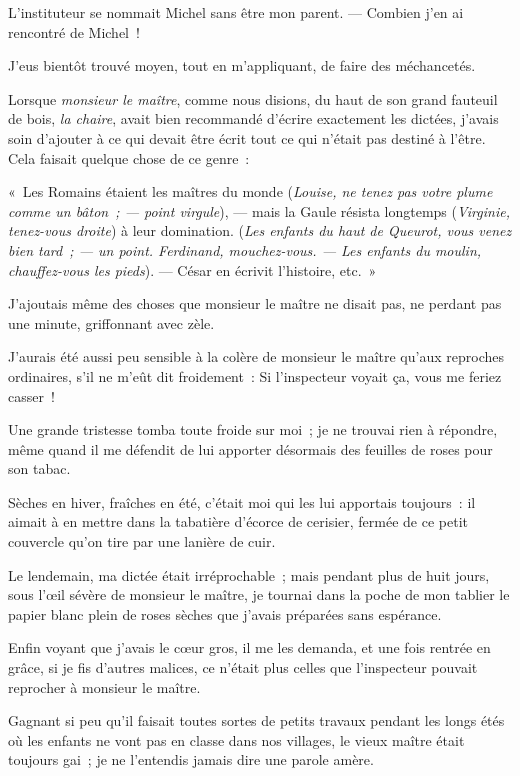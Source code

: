 \documentclass[french,twoside]{book} %
\begin{document}
L’instituteur se nommait Michel sans être mon parent. — Combien j’en ai rencontré de Michel !\par
J’eus bientôt trouvé moyen, tout en m’appliquant, de faire des méchancetés.\par
Lorsque \emph{monsieur le maître}, comme nous disions, du haut de son grand fauteuil de bois, \emph{la chaire}, avait bien recommandé d’écrire exactement les dictées, j’avais soin d’ajouter à ce qui devait être écrit tout ce qui n’était pas destiné à l’être. Cela faisait quelque chose de ce genre :\par
 « Les Romains étaient les maîtres du monde (\emph{Louise, ne tenez pas votre plume comme un bâton ; — point virgule}), — mais la Gaule résista longtemps (\emph{Virginie, tenez-vous droite}) à leur domination. (\emph{Les enfants du haut de Queurot, vous venez bien tard ; — un point. Ferdinand, mouchez-vous. — Les enfants du moulin, chauffez-vous les pieds}). — César en écrivit l’histoire, etc. »\par
J’ajoutais même des choses que monsieur le maître ne disait pas, ne perdant pas une minute, griffonnant avec zèle.\par
J’aurais été aussi peu sensible à la colère de monsieur le maître qu’aux reproches ordinaires, s’il ne m’eût dit froidement : Si l’inspecteur voyait ça, vous me feriez casser !\par
Une grande tristesse tomba toute froide sur moi ; je ne trouvai rien à répondre, même quand il me défendit de lui apporter désormais des feuilles de roses pour son tabac.\par
Sèches en hiver, fraîches en été, c’était moi qui les lui apportais toujours : il aimait à en mettre dans la tabatière d’écorce de cerisier, fermée de ce petit couvercle qu’on tire par une lanière de cuir.\par
Le lendemain, ma dictée était irréprochable ; mais pendant plus de huit jours, sous l’œil sévère de monsieur le maître, je tournai dans la poche  de mon tablier le papier blanc plein de roses sèches que j’avais préparées sans espérance.\par
Enfin voyant que j’avais le cœur gros, il me les demanda, et une fois rentrée en grâce, si je fis d’autres malices, ce n’était plus celles que l’inspecteur pouvait reprocher à monsieur le maître.\par
Gagnant si peu qu’il faisait toutes sortes de petits travaux pendant les longs étés où les enfants ne vont pas en classe dans nos villages, le vieux maître était toujours gai ; je ne l’entendis jamais dire une parole amère.\par
\end{document}
